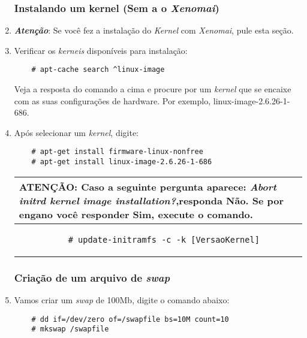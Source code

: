\documentclass[a4paper,10pt]{article}
\begin{document}
\begin{enumerate}
    \subsubsection{Instalando um kernel (Sem a o \emph{Xenomai})}
    \item \textbf{\emph{Atenção}}: Se você fez a instalação do \emph{Kernel} com \emph{Xenomai}, pule esta seção.
    \item Verificar os \emph{kerneis} disponíveis para instalação:
      \begin{lstlisting}
	# apt-cache search ^linux-image
      \end{lstlisting}
      Veja a resposta do comando a cima e procure por um \emph{kernel} que se encaixe com as 
      suas configurações de hardware. Por exemplo, linux-image-2.6.26-1-686.
    \item Após selecionar um \emph{kernel}, digite:
      \begin{lstlisting}
	# apt-get install firmware-linux-nonfree
	# apt-get install linux-image-2.6.26-1-686
      \end{lstlisting}

	 \begin{center}
	    \begin{tabular}{|p{8cm}|}
	      \hline
		\textbf{ATENÇÃO}: Caso a seguinte pergunta aparece: \emph{Abort initrd kernel 
		    image installation?},responda Não. Se por engano você responder Sim, 
		    execute o comando.\\
	      \hline
		\begin{verbatim}
		  # update-initramfs -c -k [VersaoKernel]
		\end{verbatim}\\
	      \hline
	    \end{tabular}
	  \end{center}

    \subsubsection{Criação de um arquivo de \emph{swap}}
    \item Vamos criar um \emph{swap} de 100Mb, digite o comando abaixo:
      \begin{lstlisting}
	# dd if=/dev/zero of=/swapfile bs=10M count=10
	# mkswap /swapfile
      \end{lstlisting}


\end{enumerate}
\end{document}
